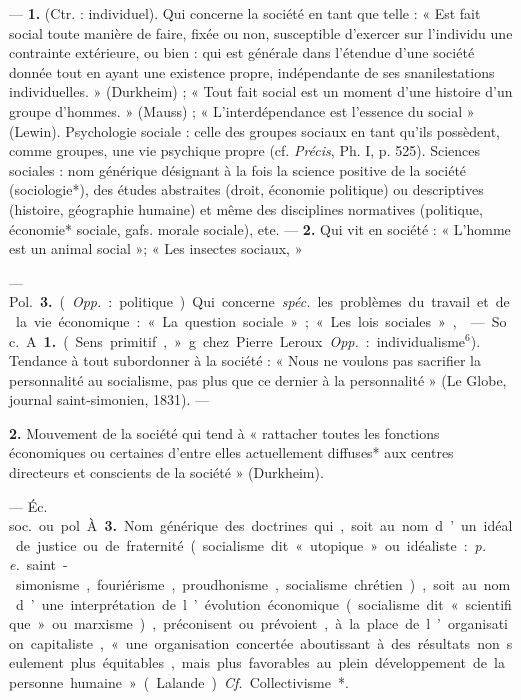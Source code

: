 \begin{itemize}[leftmargin=1cm, label=, itemsep=1pt]
 — {\bf 1.} (Ctr. : individuel). Qui
concerne la société en tant que telle :
« Est fait social toute manière de
faire, fixée ou non, susceptible
d'exercer sur l'individu une contrainte extérieure, ou bien : qui est
générale dans l'étendue d’une société donnée tout en ayant une existence propre, indépendante de ses
snanilestations individuelles. » (Durkheim) ; « Tout fait social est un
moment d’une histoire d’un groupe
d'hommes. » (Mauss) ; « L’interdépendance est l'essence du social »
(Lewin). Psychologie sociale : celle
des groupes sociaux en tant qu'ils
possèdent, comme groupes, une vie
psychique propre (cf. {\it Précis}, Ph. I,
p. 525). Sciences sociales : nom
générique désignant à la fois la
science positive de la société (sociologie*), des études abstraites (droit,
économie politique) ou descriptives
(histoire, géographie humaine) et
même des disciplines normatives
(politique, économie* sociale, gafs.
morale sociale), ete. — {\bf 2.} Qui vit
en société : « L'homme est un
animal social »; « Les insectes sociaux, »

— \si{Pol.} {\bf 3.} ({\it Opp.} : politique). Qui
concerne {\it spéc.} les problèmes du travail et de la vie économique : « La
question sociale »; « Les lois sociales »,

 — \si{Soc.} A. {\bf 1.} (Sens primitif, »g. chez Pierre Leroux. {\it Opp.} :
individualisme$^6$). Tendance à tout
subordonner à la société : « Nous ne
voulons pas sacrifier la personnalité
au socialisme, pas plus que ce dernier à la personnalité » (Le Globe,
journal saint-simonien, 1831). —

 {\bf 2.} Mouvement de la société qui tend
à « rattacher toutes les fonctions
économiques ou certaines d’entre
elles actuellement diffuses* aux
centres directeurs et conscients de
la société » (Durkheim).

— \si{Éc. soc.} ou pol. À. {\bf 3.} Nom
générique des doctrines qui, soit au
nom d’un idéal de justice ou de fraternité (socialisme dit « utopique »
ou idéaliste : {\it p. e.} saint-simonisme,
fouriérisme, proudhonisme, socialisme chrétien), soit au nom d’une
interprétation de l’évolution économique (socialisme dit « scientifique »
ou marxisme), préconisent ou prévoient, à la place de l’organisation
capitaliste, « une organisation concertée aboutissant à des résultats
non seulement plus équitables, mais
plus favorables au plein développement de la personne humaine » (Lalande). {\it Cf.} Collectivisme*.


\end{itemize}
